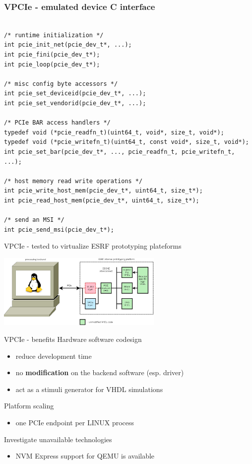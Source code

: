 \documentclass{beamer}
\begin{document}
\begin{frame}[containsverbatim]
 \frametitle{VPCIe - emulated device C interface}
 \begin{tiny}
 \lstset{language=C}
 \begin{lstlisting}[frame=tb]

/* runtime initialization */
int pcie_init_net(pcie_dev_t*, ...);
int pcie_fini(pcie_dev_t*);
int pcie_loop(pcie_dev_t*);

/* misc config byte accessors */
int pcie_set_deviceid(pcie_dev_t*, ...);
int pcie_set_vendorid(pcie_dev_t*, ...);

/* PCIe BAR access handlers */
typedef void (*pcie_readfn_t)(uint64_t, void*, size_t, void*);
typedef void (*pcie_writefn_t)(uint64_t, const void*, size_t, void*);
int pcie_set_bar(pcie_dev_t*, ..., pcie_readfn_t, pcie_writefn_t, ...);

/* host memory read write operations */
int pcie_write_host_mem(pcie_dev_t*, uint64_t, size_t*);
int pcie_read_host_mem(pcie_dev_t*, uint64_t, size_t*);

/* send an MSI */
int pcie_send_msi(pcie_dev_t*);
 \end{lstlisting}
 \end{tiny}
\end{frame}

\begin{frame}{VPCIe - tested to virtualize ESRF prototyping plateforms}
  \begin{center}
  \includegraphics[width=80mm]{pic/dv_ebone/main.jpeg}
  \end{center}
\end{frame}

\begin{frame}{VPCIe - benefits}
  Hardware software codesign
  \begin{itemize}
  \item reduce development time
  \item no \textbf{modification} on the backend software (esp. driver)
  \item act as a stimuli generator for VHDL simulations
  \end{itemize}

  Platform scaling
  \begin{itemize}
  \item one PCIe endpoint per LINUX process
  \end{itemize}

  Investigate unavailable technologies
  \begin{itemize}
  \item NVM Express support for QEMU is available
  \end{itemize}
\end{frame}
\end{document}
